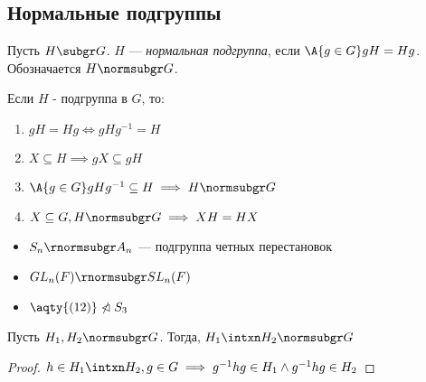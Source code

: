 \subsection{Нормальные подгруппы}
\begin{definition}
  Пусть $H\subgr G$. $H$ --- \emph{нормальная подгруппа}, если $\A{g\in G} gH=Hg$. Обозначается $H\normsubgr G$.
\end{definition}
\begin{remark}
  Если $H$ - подгруппа в $G$, то:
  \begin{enumerate}
    \item $gH=Hg\iff gHg^{-1}=H$
    \item $X\subseteq H \implies gX\subseteq gH$
    \item $\A{g\in G} gHg^{-1}\subseteq H \implies H\normsubgr G$ \label{rem:normsubgr3}
    \item $X\subseteq G, H\normsubgr G \implies XH=HX$
  \end{enumerate}
\end{remark}
\begin{examples}
  \theoremlistshack
  \begin{itemize}
    \item $S_n \rnormsubgr A_n$ --- подгруппа четных перестановок
    \item $GL_n(F) \rnormsubgr SL_n(F)$
    \item $\aqty{(12)}\ntriangleleft S_3$
  \end{itemize}
\end{examples}

\begin{theorem}
  Пусть $H_1, H_2 \normsubgr G$. Тогда, $H_1\intxn H_2 \normsubgr G$
\end{theorem}
\begin{proof}
  $h\in H_1\intxn H_2, g\in G \implies g^{-1} hg\in H_1 \land g^{-1} hg\in H_2$
\end{proof}

